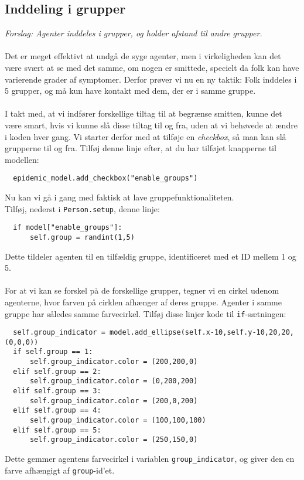 \documentclass{article}
\begin{document}
\subsection{Inddeling i grupper}
\textit{Forslag: Agenter inddeles i grupper, og holder afstand til andre grupper.}\\\\
Det er meget effektivt at undgå de syge agenter, men i virkeligheden kan det være svært at se med det samme, om nogen er smittede, specielt da folk kan have varierende grader af symptomer. Derfor prøver vi nu en ny taktik: Folk inddeles i 5 grupper, og må kun have kontakt med dem, der er i samme gruppe.\\\\
I takt med, at vi indfører forskellige tiltag til at begrænse smitten, kunne det være smart, hvis vi kunne slå disse tiltag til og fra, uden at vi behøvede at ændre i koden hver gang. Vi starter derfor med at tilføje en \textit{checkbox}, så man kan slå grupperne til og fra. Tilføj denne linje efter, at du har tilføjet knapperne til modellen:
\begin{lstlisting}
  epidemic_model.add_checkbox("enable_groups")
\end{lstlisting}
Nu kan vi gå i gang med faktisk at lave gruppefunktionaliteten.\\
Tilføj, nederst i \texttt{Person.setup}, denne linje:
\begin{lstlisting}
  if model["enable_groups"]:
      self.group = randint(1,5)
\end{lstlisting}
Dette tildeler agenten til en tilfældig gruppe, identificeret med et ID mellem 1 og 5.\\\\
For at vi kan se forskel på de forskellige grupper, tegner vi en cirkel udenom agenterne, hvor farven på cirklen afhænger af deres gruppe. Agenter i samme gruppe har således samme farvecirkel. Tilføj disse linjer kode til \texttt{if}-sætningen:
\begin{lstlisting}
  self.group_indicator = model.add_ellipse(self.x-10,self.y-10,20,20,(0,0,0))
  if self.group == 1:
      self.group_indicator.color = (200,200,0)
  elif self.group == 2:
      self.group_indicator.color = (0,200,200)
  elif self.group == 3:
      self.group_indicator.color = (200,0,200)
  elif self.group == 4:
      self.group_indicator.color = (100,100,100)
  elif self.group == 5:
      self.group_indicator.color = (250,150,0)
\end{lstlisting}
Dette gemmer agentens farvecirkel i variablen \texttt{group\_indicator}, og giver den en farve afhængigt af \texttt{group}-id'et.\\\\
\end{document}
